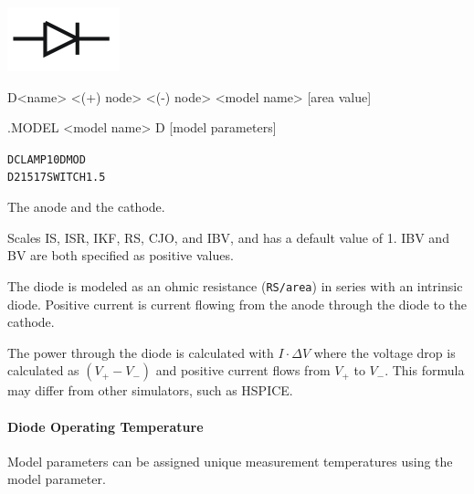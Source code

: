 


\begin{Device}\label{D_DEVICE}

\symbol
{\includegraphics{diodeSymbol}}

\device
D<name> <(+) node> <(-) node> <model name> [area value]

\model
.MODEL <model name> D [model parameters]

\examples
\begin{alltt}
  DCLAMP 1 0 DMOD
  D2 15 17 SWITCH 1.5
\end{alltt}

\parameters
\begin{Parameters}


The anode and the cathode.


Scales IS, ISR, IKF, RS, CJO, and IBV, and has a default value of 1.
IBV and BV are both specified as positive values.

\end{Parameters}

\comments

The diode is modeled as an ohmic resistance (\texttt{RS/area}) in series
with an intrinsic diode.  Positive current is current flowing from the
anode through the diode to the cathode. 

The power through the diode is calculated 
with $I \cdot \Delta V$ where the voltage drop is calculated as $(V_+ - V_-)$ 
and positive current flows from $V_+$ to $V_-$.  This formula may differ from
other simulators, such as HSPICE.

\end{Device}

\paragraph{Diode Operating Temperature}
 Model parameters can be assigned unique
measurement temperatures using the  model parameter.

